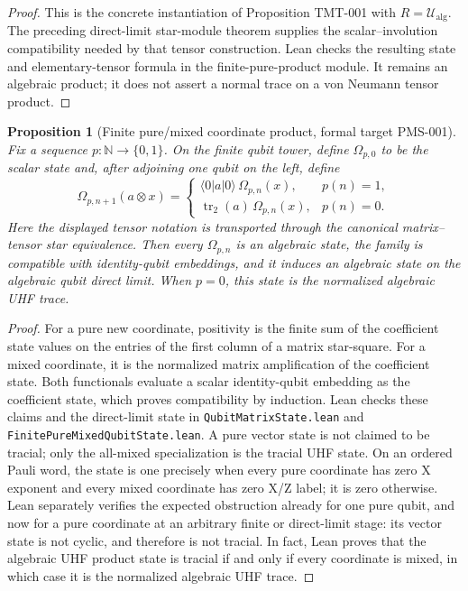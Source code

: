 \documentclass{article}
\newtheorem{proposition}[definition]{Proposition}
\begin{document}
\begin{proof}
This is the concrete instantiation of Proposition TMT-001 with
$R=\mathcal U_{\mathrm{alg}}$.  The preceding direct-limit
star-module theorem supplies the scalar--involution compatibility needed by
that tensor construction.  Lean checks the resulting state and
elementary-tensor formula in the finite-pure-product module.  It remains an
algebraic product; it does not assert a normal trace on a von Neumann tensor
product.
\end{proof}

\begin{proposition}[Finite pure/mixed coordinate product, formal target PMS-001]
\label{prop:finite_pure_mixed_coordinate_product}
Fix a sequence $p:\mathbb N\to\{0,1\}$.  On the finite qubit tower, define
$\Omega_{p,0}$ to be the scalar state and, after adjoining one qubit on the
left, define
\begin{equation*}
  \Omega_{p,n+1}(a\otimes x)=
  \begin{cases}
    \langle 0|a|0\rangle\,\Omega_{p,n}(x),&p(n)=1,\\
    \operatorname{tr}_2(a)\,\Omega_{p,n}(x),&p(n)=0.
  \end{cases}
\end{equation*}
Here the displayed tensor notation is transported through the canonical
matrix--tensor star equivalence.  Then every $\Omega_{p,n}$ is an algebraic
state, the family is compatible with identity-qubit embeddings, and it induces
an algebraic state on the algebraic qubit direct limit.  When $p=0$, this
state is the normalized algebraic UHF trace.
\end{proposition}

\begin{proof}
For a pure new coordinate, positivity is the finite sum of the coefficient
state values on the entries of the first column of a matrix star-square.  For a
mixed coordinate, it is the normalized matrix amplification of the coefficient
state.  Both functionals evaluate a scalar identity-qubit embedding as the
coefficient state, which proves compatibility by induction.  Lean checks these
claims and the direct-limit state in
\texttt{QubitMatrixState.lean} and
\texttt{FinitePureMixedQubitState.lean}.  A pure vector state is not claimed
to be tracial; only the all-mixed specialization is the tracial UHF state.  On
an ordered Pauli word, the state is one precisely when every pure coordinate
has zero X exponent and every mixed coordinate has zero X/Z label; it is zero
otherwise.  Lean separately verifies the expected obstruction already for one
pure qubit, and now for a pure coordinate at an arbitrary finite or
direct-limit stage: its vector state is not cyclic, and therefore is not
tracial.  In fact, Lean proves that the algebraic UHF product state is tracial
if and only if every coordinate is mixed, in which case it is the normalized
algebraic UHF trace.
\end{proof}
\end{document}
